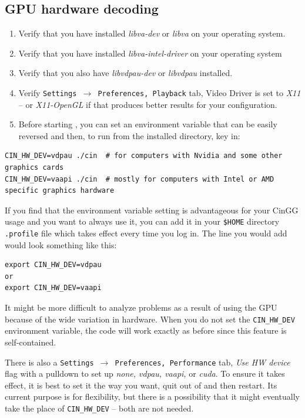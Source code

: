 \subsection{GPU hardware decoding}%
\label{sub:gpu_hardware_decoding}

\begin{enumerate}
	\item Verify that you have installed \textit{libva-dev} or \textit{libva} on your operating system.
	\item Verify that you have installed \textit{libva-intel-driver} on your operating system
        \item Verify that you also have \textit{libvdpau-dev} or \textit{libvdpau} installed.
	\item Verify \texttt{Settings $\rightarrow$ Preferences, Playback} tab, Video Driver is set to\textit{ X11} -- or \textit{X11-OpenGL} if that	produces better results for your configuration.
	\item Before starting \CGG{}, you can set an environment variable that can be easily reversed and
	then, to run from the \CGG{} installed directory, key in:
\end{enumerate}

\begin{lstlisting}[numbers=none]
CIN_HW_DEV=vdpau ./cin	# for computers with Nvidia and some other graphics cards
CIN_HW_DEV=vaapi ./cin	# mostly for computers with Intel or AMD specific graphics hardware
\end{lstlisting}

If you find that the environment variable setting is advantageous for your CinGG usage and you want to always use it, you can add it in your \texttt{\$HOME} directory \texttt{.profile} file which takes effect every time you log in.  The line you would add would look something like this:

\begin{lstlisting}[numbers=none]
export CIN_HW_DEV=vdpau
or
export CIN_HW_DEV=vaapi
\end{lstlisting}

It might be more difficult to analyze problems as a result of using the GPU because of the wide variation in hardware.  When you do not set the \texttt{CIN\_HW\_DEV} environment variable, the code will work exactly as before since this feature is self-contained.

There is also a \texttt{Settings $\rightarrow$ Preferences, Performance} tab, \textit{Use HW device} flag
with a pulldown to set up \textit{none, vdpau, vaapi,} or \textit{cuda}.  To ensure it takes effect, it is best to set it the way you want, quit out of \CGG{} and then restart.  Its current purpose is for flexibility, but there is a possibility that it might eventually take the place of \texttt{CIN\_HW\_DEV} -- both are not needed.

